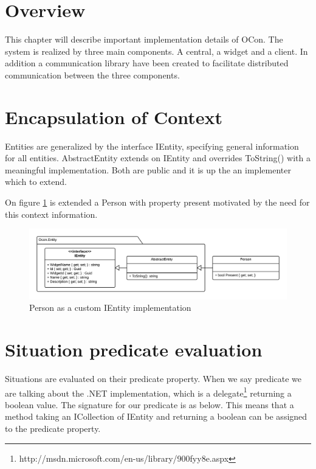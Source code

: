 \documentclass[../report.tex]{subfiles}
\begin{document}
\graphicspath{{img/}{../img/}}

\section{Overview}
This chapter will describe important implementation details of OCon. The system is realized by three main components. A central, a widget and a client. In addition a communication library have been created to facilitate distributed communication between the three components.


\section{Encapsulation of Context}

Entities are generalized by the interface IEntity, specifying general information for all entities. AbstractEntity extends on IEntity and overrides ToString() with a meaningful implementation. Both are public and it is up the an implementer which to extend.

On figure \ref{fig:PersonImplementation} is extended a Person with property present motivated by the need for this context information.


\begin{figure}[H]
\includegraphics[width=\linewidth]{customEntityClass.png}
\caption{Person as a custom IEntity implementation}
\label{fig:PersonImplementation}
\end{figure}



\section{Situation predicate evaluation}

Situations are evaluated on their predicate property. When we say predicate we are talking about the .NET implementation, which is a delegate\footnote{http://msdn.microsoft.com/en-us/library/900fyy8e.aspx} returning a boolean value. The signature for our predicate is as below. This means that a method taking an ICollection of IEntity and returning a boolean can be assigned to the predicate property.
\end{document}
